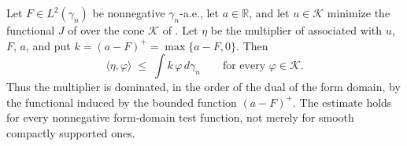 \begin{lemma}
Let $F \in L^2(\gamma_n)$ be nonnegative $\gamma_n$-a.e., let $a \in \mathbb{R}$,
and let $u \in \mathcal{K}$ minimize the functional $J$ of
 over the cone $\mathcal{K}$ of
.  Let $\eta$ be the multiplier of
 associated with $u$, $F$, $a$, and put
$k = (a-F)^+ = \max\{a-F, 0\}$.  Then
\[
  \langle \eta, \varphi\rangle \;\leq\; \int k\,\varphi \, d\gamma_n
  \qquad\text{for every } \varphi \in \mathcal{K} .
\]
Thus the multiplier is dominated, in the order of the dual of the form domain, by
the functional induced by the bounded function $(a-F)^+$.  The estimate holds for
every nonnegative form-domain test function, not merely for smooth compactly
supported ones.
\end{lemma}
